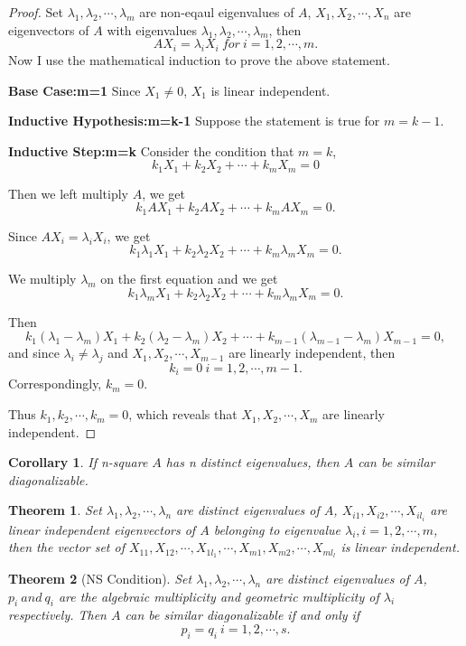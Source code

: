 \documentclass{article}
\newtheorem{theorem}{Theorem}[section]
\newtheorem{corollary}{Corollary}[theorem]
\theoremstyle{definition}
\begin{document}
\begin{proof}
Set $\lambda_{1},\lambda_{2},\cdots,\lambda_{m}$ are non-eqaul eigenvalues of $A$, $X_{1},X_{2},\cdots,X_{n}$ 
are eigenvectors of $A$ with eigenvalues $\lambda_{1},\lambda_{2},\cdots,\lambda_{m}$, then 
$$ AX_{i}=\lambda_{i}X_{i}\ for\ i=1,2,\cdots,m.$$
Now I use the mathematical induction to prove the above statement.

\textbf{Base Case:m=1} Since $X_{1}\neq 0$, $X_{1}$ is linear independent.

\textbf{Inductive Hypothesis:m=k-1} Suppose the statement is true for $m=k-1$.

\textbf{Inductive Step:m=k} Consider the condition that $m=k$, 
$$k_{1}X_{1}+k_{2}X_{2}+\cdots+k_{m}X_{m}=0$$

Then we left multiply $A$, we get 
$$k_{1}AX_{1}+k_{2}AX_{2}+\cdots+k_{m}AX_{m}=0.$$

Since $AX_{i}=\lambda_{i}X_{i}$, we get 
$$k_{1}\lambda_{1}X_{1}+k_{2}\lambda_{2}X_{2}+\cdots+k_{m}\lambda_{m}X_{m}=0.$$

We multiply $\lambda_{m}$ on the first equation and we get 
$$k_{1}\lambda_{m}X_{1}+k_{2}\lambda_{2}X_{2}+\cdots+k_{m}\lambda_{m}X_{m}=0.$$

Then
$$k_{1}(\lambda_{1}-\lambda_{m})X_{1}+k_{2}(\lambda_{2}-\lambda_{m})X_{2}+\cdots+k_{m-1}(\lambda_{m-1}-\lambda_{m})X_{m-1}=0,$$
and since $\lambda_{i}\neq\lambda_{j}$ and $X_{1},X_{2},\cdots,X_{m-1}$ are linearly independent, 
then $$k_{i}=0\ i=1,2,\cdots,m-1.$$
Correspondingly, $k_{m}=0$.

Thus $k_{1},k_{2},\cdots,k_{m}=0$, which reveals that $X_{1},X_{2},\cdots,X_{m}$ are linearly independent.
\end{proof}

\begin{corollary}
    If n-square $A$ has n distinct eigenvalues, then $A$ can be similar diagonalizable.
\end{corollary}

\begin{theorem}
Set $\lambda_{1},\lambda_{2},\cdots,\lambda_{n}$ are distinct eigenvalues of $A$, $X_{i1},X_{i2},\cdots,X_{il_{i}}$ 
are linear independent eigenvectors of $A$ belonging to eigenvalue $\lambda_{i},i=1,2,\cdots,m$, then the vector set of $X_{11},X_{12},\cdots,X_{1l_{1}},\cdots,X_{m1},X_{m2},\cdots,X_{ml_{l}}$ is linear independent.
\end{theorem}




\begin{theorem}[NS Condition]
    Set $\lambda_{1},\lambda_{2},\cdots,\lambda_{n}$ are distinct eigenvalues of $A$, $p_{i}\ and\ q_{i}$ are the algebraic multiplicity and geometric multiplicity of $\lambda_{i}$ respectively.
    Then $A$ can be similar diagonalizable if and only if
    $$p_{i}=q_{i}\ i=1,2,\cdots,s.$$
\end{theorem}
\end{document}
